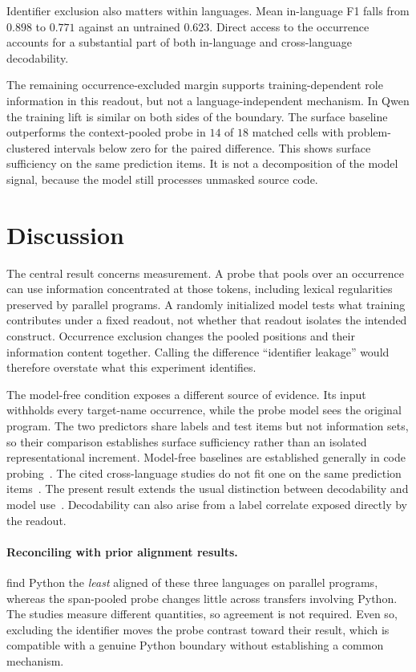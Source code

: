 \documentclass{article}
\begin{document}
Identifier exclusion also matters within languages. Mean in-language F1 falls
from $0.898$ to $0.771$ against an untrained $0.623$. Direct access to the
occurrence accounts for a substantial part of both in-language and
cross-language decodability.

The remaining occurrence-excluded margin supports training-dependent role
information in this readout, but not a language-independent mechanism. In
Qwen the training lift is similar on both sides of the boundary.
The surface baseline
outperforms the context-pooled probe in $14$ of $18$ matched cells with
problem-clustered intervals below zero for the paired difference. This shows
surface sufficiency on the same prediction items. It is not a decomposition of
the model signal, because the model still processes unmasked source code.

\section{Discussion}

The central result concerns measurement. A probe that pools over an occurrence
can use information concentrated at those tokens, including lexical
regularities preserved by parallel programs. A randomly initialized model
tests what training contributes under a fixed readout, not whether that readout
isolates the intended construct. Occurrence exclusion changes the pooled
positions and their information content together. Calling the difference
``identifier leakage'' would therefore overstate what this experiment
identifies.

The model-free condition exposes a different source of evidence. Its input
withholds every target-name occurrence, while the probe model sees the original
program. The two predictors share labels and test items but not information
sets, so their comparison establishes surface sufficiency rather than an
isolated representational increment.
Model-free baselines are established generally in code
probing~\citep{troshin2022probing}. The cited cross-language studies do not fit
one on the same prediction
items~\citep{hernandezlopez2026syntactic,utpala2024language,kargaran2025programming}.
The present result extends the usual distinction between decodability and model
use~\citep{elazar2021amnesic,belinkov2022probing}. Decodability can also arise from a
label correlate exposed directly by the readout.

\paragraph{Reconciling with prior alignment results.}
\citet{kargaran2025programming} find Python the \emph{least} aligned of these
three languages on parallel programs, whereas the span-pooled probe changes
little across transfers involving Python. The studies measure different
quantities, so agreement is not required. Even so, excluding the identifier
moves the probe contrast toward their result, which is compatible with a
genuine Python boundary without establishing a common mechanism.
\end{document}
